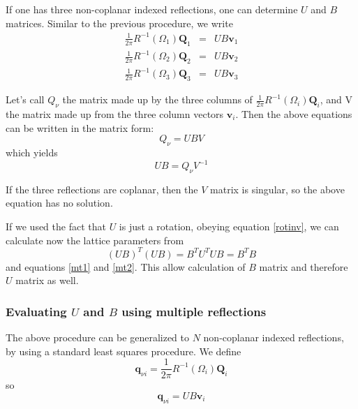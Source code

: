 \documentclass[prb]{revtex4}%
\begin{document}
If one has three non-coplanar indexed reflections, one can determine $U$ and $B$ matrices.
Similar to the previous procedure, we write
\begin{eqnarray}
  \frac{1}{2 \pi} R^{-1}(\Omega_1)\textbf{Q}_1 &=&   U B \textbf{v}_1 \\
  \frac{1}{2 \pi} R^{-1}(\Omega_2)\textbf{Q}_2 &=&   U B \textbf{v}_2 \\
  \frac{1}{2 \pi} R^{-1}(\Omega_3)\textbf{Q}_3 &=&   U B \textbf{v}_3
\end{eqnarray}

Let's call $Q_{\nu}$ the matrix made up by the three columns of $\frac{1}{2 \pi} R^{-1}(\Omega_i)\textbf{Q}_i$,
and V the matrix made up from the three column vectors $\textbf{v}_i$. Then the above equations
can be written in the matrix form:
\begin{equation}
   Q_{\nu} = U B V
\end{equation}
which yields
\begin{equation}
   U B = Q_{\nu}V^{-1}
\end{equation}

If the three reflections are coplanar, then the $V$ matrix is singular, so the above equation has
no solution.

If we used the fact that $U$ is just a rotation, obeying equation
\ref{rotinv}, we can calculate now the lattice parameters from
\begin{equation}
    (U B)^T (U B) = B^T U^T U B = B^T B
\end{equation}
and equations \ref{mt1} and \ref{mt2}. This allow calculation of $B$ matrix and therefore $U$ matrix as well.


\subsubsection{Evaluating $U$ and $B$ using multiple reflections}

The above procedure can be generalized to $N$ non-coplanar indexed reflections, by using a
standard least squares procedure. We define
\begin{equation}
    \textbf{q}_{\nu i} = \frac{1}{2 \pi} R^{-1}(\Omega_i)\textbf{Q}_i
\end{equation}
so
\begin{equation}
    \textbf{q}_{\nu i} = U B \textbf{v}_i
\end{equation}
\end{document}
